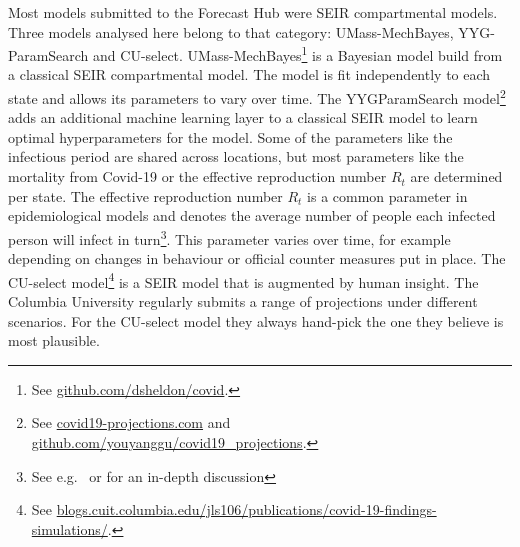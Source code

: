 \documentclass[
]{book}
\begin{document}
Most models submitted to the Forecast Hub were SEIR compartmental models. Three models analysed here belong to that category: UMass-MechBayes, YYG-ParamSearch and CU-select. UMass-MechBayes\footnote{See \href{https://github.com/dsheldon/covid}{github.com/dsheldon/covid}.} is a Bayesian model build from a classical SEIR compartmental model. The model is fit independently to each state and allows its parameters to vary over time. The YYGParamSearch model\footnote{See \href{https://covid19-projections.com}{covid19-projections.com} and \href{https://github.com/youyanggu/covid19_projections}{github.com/youyanggu/covid19\_projections}.} adds an additional machine learning layer to a classical SEIR model to learn optimal hyperparameters for the model. Some of the parameters like the infectious period are shared across locations, but most parameters like the mortality from Covid-19 or the effective reproduction number \(R_t\) are determined per state. The effective reproduction number \(R_t\) is a common parameter in epidemiological models and denotes the average number of people each infected person will infect in turn\footnote{See e.g.~\citet{nishiuraEffectiveReproductionNumber2009} or \citet{coriNewFrameworkSoftware2013} for an in-depth discussion}. This parameter varies over time, for example depending on changes in behaviour or official counter measures put in place. The CU-select model\footnote{See \href{https://blogs.cuit.columbia.edu/jls106/publications/covid-19-findings-simulations/}{blogs.cuit.columbia.edu/jls106/publications/covid-19-findings-simulations/}.} is a SEIR model that is augmented by human insight. The Columbia University regularly submits a range of projections under different scenarios. For the CU-select model they always hand-pick the one they believe is most plausible.
\end{document}
